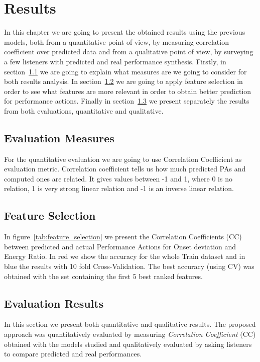 \chapter{Results}
\label{chap:results}
In this chapter we are going to present the obtained results using the previous models, both from a quantitative point of view, by measuring correlation coefficient over predicted data and from a qualitative point of view, by surveying a few listeners with predicted and real performance synthesis. Firstly, in section~\ref{sec:ev_measures} we are going to explain what measures are we going to consider for both results analysis. In section~\ref{sec:features} we are going to apply feature selection in order to see what features are more relevant in order to obtain better prediction for performance actions. Finally in section~\ref{sec:ev_results} we present separately the results from both evaluations, quantitative and qualitative.

\section{Evaluation Measures}
\label{sec:ev_measures}
For the quantitative evaluation we are going to use Correlation Coefficient as evaluation metric. Correlation coefficient tells us how much predicted PAs and computed ones are related. It gives values between -1 and 1, where 0 is no relation, 1 is very strong linear relation and -1 is an inverse linear relation.

\section{Feature Selection}
\label{sec:features}
In figure~\ref{tab:feature_selection} we present the Correlation Coefficients (CC) between predicted and actual Performance Actions for Onset deviation and Energy Ratio. In red we show the accuracy for the whole Train dataset and in blue the results with 10 fold Cross-Validation. The best accuracy (using CV) was obtained with the set containing the first 5 best ranked features.





\section{Evaluation Results}
\label{sec:ev_results}
In this section we present both quantitative and qualitative results. The proposed approach was quantitatively evaluated by measuring \textit{Correlation Coefficient} (CC) obtained with the models studied and qualitatively evaluated by asking listeners to compare predicted and real performances.


